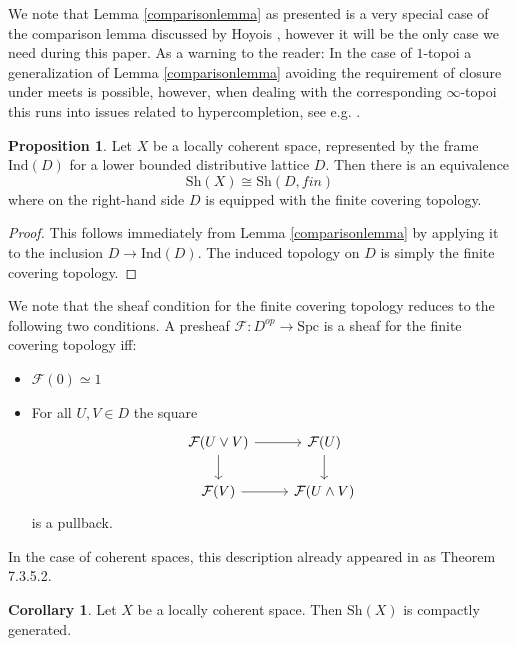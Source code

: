 \documentclass[10pt]{amsart}
\theoremstyle{definition}
\newtheorem{proposition}[theorem]{Proposition}
\newtheorem{corollary}[theorem]{Corollary}
\begin{document}
We note that Lemma \ref{comparisonlemma} as presented is a very special case of the comparison lemma discussed by Hoyois \cite{hoyois_2014}, however it will be the only case we need during this paper. As a warning to the reader: In the case of $1$-topoi a generalization of Lemma \ref{comparisonlemma} avoiding the requirement of closure under meets is possible, however, when dealing with the corresponding $\infty$-topoi this runs into issues related to hypercompletion, see e.g. \cite{dyckerhoff2025hypersheavesbases}.

\begin{proposition}
Let $X$ be a locally coherent space, represented by the frame $\mathrm{Ind}(D)$ for a lower bounded distributive lattice $D$. Then there is an equivalence
$$\mathrm{Sh}(X) \cong \mathrm{Sh}(D,fin)$$
where on the right-hand side $D$ is equipped with the finite covering topology.
\end{proposition}

\begin{proof}
This follows immediately from Lemma \ref{comparisonlemma} by applying it to the inclusion $D \rightarrow \mathrm{Ind}(D)$. The induced topology on $D$ is simply the finite covering topology.
\end{proof}

We note that the sheaf condition for the finite covering topology reduces to the following two conditions. A presheaf $\mathcal{F} : D^{op} \rightarrow \mathrm{Spc}$ is a sheaf for the finite covering topology iff:
\begin{itemize}
\item $\mathcal{F}( 0 ) \simeq 1$
\item For all $U, V \in D$ the square
\[\begin{tikzcd}
	{\mathcal{F}(U \vee V)} & {\mathcal{F}(U)} \\
	{\mathcal{F}(V)} & {\mathcal{F}(U \wedge V)}
	\arrow[from=1-1, to=1-2]
	\arrow[from=1-1, to=2-1]
	\arrow[from=1-2, to=2-2]
	\arrow[from=2-1, to=2-2]
\end{tikzcd}\]
is a pullback.
\end{itemize}
In the case of coherent spaces, this description already appeared in \cite{luriehtt} as Theorem 7.3.5.2.

\begin{corollary} \label{compgen}
Let $X$ be a locally coherent space. Then $\mathrm{Sh}(X)$ is compactly generated.
\end{corollary}
\end{document}
